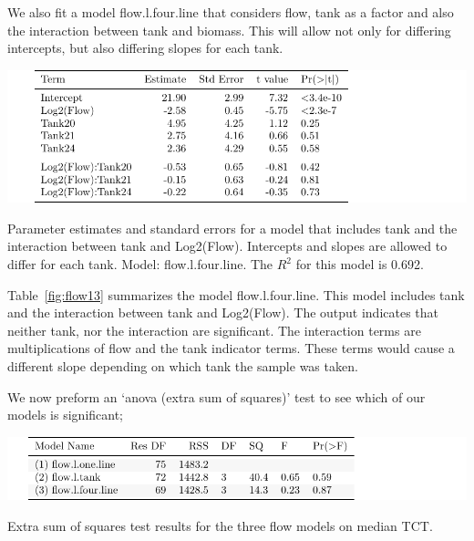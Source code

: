 \newpage

We also fit a  model flow.l.four.line that considers flow, tank as a factor and also the interaction between tank and biomass. This will allow not only for differing intercepts, but also differing slopes for each tank.

\vspace{5mm}

\begin{table}[H]
\includegraphics{Chapter4Images/lfourlinemed.pdf}
\caption{Parameter estimates and standard errors for a model that includes tank and the interaction between tank and Log2(Flow). Intercepts and slopes are allowed to differ for each tank. Model: flow.l.four.line. The $R^{2}$ for this model is 0.692.}
\label{fig:flow13}
\end{table}

Table~\ref{fig:flow13} summarizes the model flow.l.four.line. This model includes tank and the interaction between tank and Log2(Flow). The output indicates that neither tank, nor the interaction are significant. The interaction terms are multiplications of flow and the tank indicator terms. These terms would cause a different slope depending on which tank the sample was taken.

\newpage

 We now preform an `anova (extra sum of squares)' test to see which of our models is significant; 
\vspace{5mm}

\begin{table}[H]
\includegraphics{Chapter4Images/anovamed.pdf}
\caption{Extra sum of squares test results for  the three flow models on median TCT.}
\label{fig:anovaflow}
\end{table}


  
  
